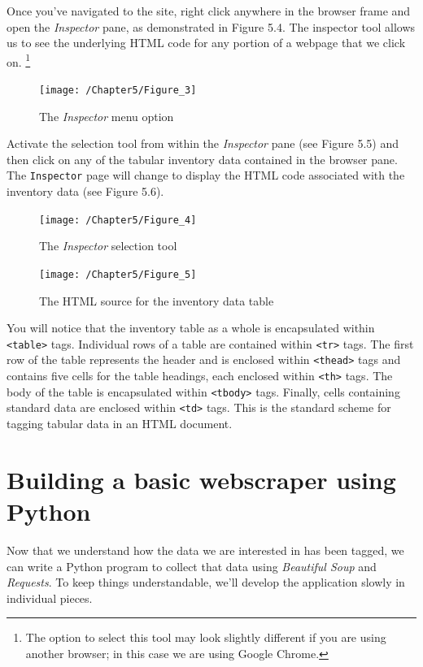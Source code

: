 \documentclass{book}
\begin{document}
	Once you've navigated to the site, right click anywhere in the browser frame and open the \textit{Inspector} pane, as demonstrated in Figure 5.4. The inspector tool allows us to see the underlying HTML code for any portion of a webpage that we click on. \footnote{The option to select this tool may look slightly different if you are using another browser; in this case we are using Google Chrome.\texttrademark}
	
	\begin{figure}[h]
		\caption{The \textit{Inspector} menu option}
		\centering\texttt{[image: /Chapter5/Figure\_3]}
	\end{figure}

	Activate the selection tool from within the \textit{Inspector} pane (see Figure 5.5) and then click on any of the tabular inventory data contained in the browser pane. The \texttt{Inspector} page will change to display the HTML code associated with the inventory data (see Figure 5.6).
	
\begin{figure}[h]
	\caption{The \textit{Inspector} selection tool}
	\centering\texttt{[image: /Chapter5/Figure\_4]}
\end{figure}

\begin{figure}[h]
	\caption{The HTML source for the inventory data table}
	\centering\texttt{[image: /Chapter5/Figure\_5]}
\end{figure}

	You will notice that the inventory table as a whole is encapsulated within \texttt{<table>} tags. Individual rows of a table are contained within \texttt{<tr>} tags. The first row of the table represents the header and is enclosed within \texttt{<thead>} tags and contains five cells for the table headings, each enclosed within \texttt{<th>} tags. The body of the table is encapsulated within \texttt{<tbody>} tags. Finally, cells containing standard data are enclosed within \texttt{<td>} tags. This is the standard scheme for tagging tabular data in an HTML document. 

\section{Building a basic webscraper using Python}

	Now that we understand how the data we are interested in has been tagged, we can write a Python program to collect that data using \textit{Beautiful Soup} and \textit{Requests}. To keep things understandable, we'll develop the application slowly in individual pieces. 
	
\end{document}
